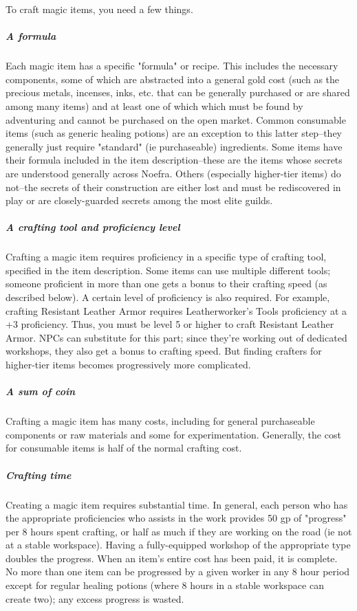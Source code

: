 To craft magic items, you need a few things.

\subparagraph*{A formula} Each magic item has a specific "formula" or recipe. This includes the necessary components, some of which are abstracted into a general gold cost (such as the precious metals, incenses, inks, etc. that can be generally purchased or are shared among many items) and at least one of which which must be found by adventuring and cannot be purchased on the open market. Common consumable items (such as generic healing potions) are an exception to this latter step--they generally just require "standard" (ie purchaseable) ingredients. Some items have their formula included in the item description--these are the items whose secrets are understood generally across Noefra. Others (especially higher-tier items) do not--the secrets of their construction are either lost and must be rediscovered in play or are closely-guarded secrets among the most elite guilds.

\subparagraph*{A crafting tool and proficiency level} Crafting a magic item requires proficiency in a specific type of crafting tool, specified in the item description. Some items can use multiple different tools; someone proficient in more than one gets a bonus to their crafting speed (as described below). A certain level of proficiency is also required. For example, crafting Resistant Leather Armor requires Leatherworker's Tools proficiency at a +3 proficiency. Thus, you must be level 5 or higher to craft Resistant Leather Armor. NPCs can substitute for this part; since they're working out of dedicated workshops, they also get a bonus to crafting speed. But finding crafters for higher-tier items becomes progressively more complicated.

\subparagraph*{A sum of coin} Crafting a magic item has many costs, including for general purchaseable components or raw materials and some for experimentation. Generally, the cost for consumable items is half of the normal crafting cost. 

\subparagraph*{Crafting time} Creating a magic item requires substantial time. In general, each person who has the appropriate proficiencies who assists in the work provides 50 gp of "progress" per 8 hours spent crafting, or half as much if they are working on the road (ie not at a stable workspace). Having a fully-equipped workshop of the appropriate type doubles the progress. When an item's entire cost has been paid, it is complete. No more than one item can be progressed by a given worker in any 8 hour period except for regular healing potions (where 8 hours in a stable workspace can create two); any excess progress is wasted.

